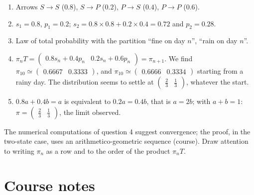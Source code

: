 \begin{solution}[Activity]
\begin{enumerate}
\item Arrows $S\to S$ ($\num{0,8}$), $S\to P$ ($\num{0,2}$), $P\to S$ ($\num{0,4}$), $P\to P$ ($\num{0,6}$).
\item $s_1=\num{0,8}$, $p_1=\num{0,2}$; $s_2=\num{0,8}\times\num{0,8}+\num{0,2}\times\num{0,4}=\num{0,72}$ and $p_2=\num{0,28}$.
\item Law of total probability with the partition ``fine on day $n$'', ``rain on day $n$''.
\item $\pi_nT=\begin{pmatrix}\num{0,8}s_n+\num{0,4}p_n&\num{0,2}s_n+\num{0,6}p_n\end{pmatrix}=\pi_{n+1}$. We find $\pi_{10}\simeq\begin{pmatrix}\num{0,6667}&\num{0,3333}\end{pmatrix}$, and $\pi_{10}\simeq\begin{pmatrix}\num{0,6666}&\num{0,3334}\end{pmatrix}$ starting from a rainy day. The distribution seems to settle at $\begin{pmatrix}\frac23&\frac13\end{pmatrix}$, whatever the start.
\item $\num{0,8}a+\num{0,4}b=a$ is equivalent to $\num{0,2}a=\num{0,4}b$, that is $a=2b$; with $a+b=1$: $\pi=\begin{pmatrix}\frac23&\frac13\end{pmatrix}$, the limit observed.
\end{enumerate}
\end{solution}
\begin{teachernote}
The numerical computations of question 4 suggest convergence; the proof, in the two-state case, uses an arithmetico-geometric sequence (course). Draw attention to writing $\pi_n$ as a row and to the order of the product $\pi_nT$.
\end{teachernote}

\mxnewpage
\section{Course notes}
